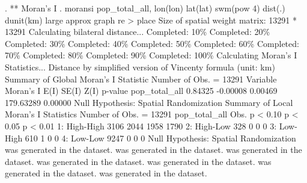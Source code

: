. ** Moran's I
. moransi pop_total_all, lon(lon) lat(lat) swm(pow 4) dist(.) dunit(km) large approx graph re
> place
{\smallskip}
Size of spatial weight matrix: 13291 * 13291
Calculating bilateral distance...
{\TOPT}
{\VBAR}Completed:  10\%{\VBAR}
{\VBAR}Completed:  20\%{\VBAR}
{\VBAR}Completed:  30\%{\VBAR}
{\VBAR}Completed:  40\%{\VBAR}
{\VBAR}Completed:  50\%{\VBAR}
{\VBAR}Completed:  60\%{\VBAR}
{\VBAR}Completed:  70\%{\VBAR}
{\VBAR}Completed:  80\%{\VBAR}
{\VBAR}Completed:  90\%{\VBAR}
{\VBAR}Completed: 100\%{\VBAR}
{\BOTT}
Calculating Moran's I Statistics...
{\smallskip}
Distance by simplified version of Vincenty formula (unit: km)
{\smallskip}
Summary of Global Moran's I Statistic                      Number of Obs. =     13291
            Variable {\VBAR}  Moran's I         E(I)        SE(I)         Z(I)      p-value
       pop_total_all {\VBAR}    0.84325     -0.00008      0.00469    179.63289      0.00000
Null Hypothesis: Spatial Randomization
{\smallskip}
{\smallskip}
Summary of Local Moran's I Statistics                      Number of Obs. =     13291
       pop_total_all {\VBAR}           Obs.        p < 0.10        p < 0.05        p < 0.01
        1: High-High {\VBAR}           3106            2044            1958            1790
        2: High-Low  {\VBAR}            328               0               0               0
        3: Low-High  {\VBAR}            610               1               0               0
        4: Low-Low   {\VBAR}           9247               0               0               0
Null Hypothesis: Spatial Randomization
{\smallskip}
{} was generated in the dataset.
{} was generated in the dataset.
{} was generated in the dataset.
{} was generated in the dataset.
{} was generated in the dataset.
{} was generated in the dataset.
{} was generated in the dataset.
